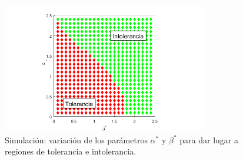 \begin{figure}[h]
	\centering
	\includegraphics[width=0.8\textwidth]{Imagenes/Simulaciones/macro_toler_intoler}
	\caption{Simulación: variación de los parámetros $\alpha^{*}$ y $\beta^{*}$ para dar lugar a regiones de tolerancia e intolerancia.}
	\label{fig:macro_toler_intoler}
\end{figure}